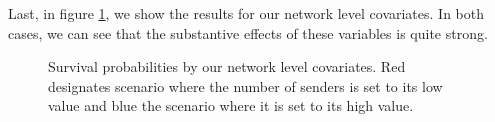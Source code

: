 Last, in figure \ref{fig:surv3}, we show the results for our network level covariates. In both cases, we can see that the substantive effects of these variables is quite strong. 

\begin{figure}[ht]
	\centering
	\caption{Survival probabilities by our network level covariates. Red designates scenario where the number of senders is set to its low value and blue the scenario where it is set to its high value.}
	\resizebox{1\textwidth}{!}{}	
	\label{fig:surv3}	
\end{figure}
\FloatBarrier